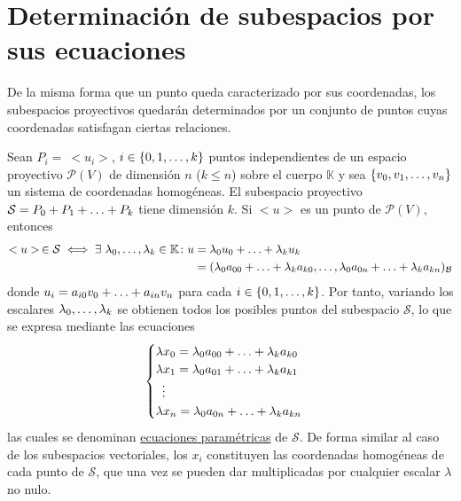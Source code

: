 \documentclass[12pt]{report}
\theoremstyle{definition}
\theoremstyle{definition}
\theoremstyle{remark}
\begin{document}
\section{Determinación de subespacios por sus ecuaciones}
De la misma forma que un punto queda caracterizado por sus coordenadas, los subespacios proyectivos quedarán determinados por un conjunto de puntos cuyas coordenadas satisfagan ciertas relaciones.

\vspace{2mm}
Sean $P_i = \ <u_i>$, $i \in \{0,1,\mathellipsis,k\}$ puntos independientes de un espacio proyectivo $\mathcal{P}(V)$ de dimensión $n$ ($k \leq n$) sobre el cuerpo $\mathbb{K}$ y sea $\{v_0,v_1,\mathellipsis,v_n\}$ un sistema de coordenadas homogéneas. El subespacio proyectivo $\mathcal{S} = P_0+P_1+\mathellipsis+P_k$ tiene dimensión $k$. Si $<u>$ es un punto de $\mathcal{P}(V)$, entonces
\[<u> \, \in \mathcal{S} \iff
\begin{aligned}[t]
\exists \ \lambda_0,\mathellipsis,\lambda_k \in \mathbb{K} \colon u &= \lambda_0u_0+\mathellipsis+\lambda_ku_k \\
&= (\lambda_0a_{00}+\mathellipsis+\lambda_ka_{k0},\mathellipsis,\lambda_0a_{0n}+\mathellipsis+\lambda_ka_{kn})_{\mathcal{B}}
\end{aligned}
\]
donde $u_i = a_{i0}v_0+\mathellipsis+a_{in}v_n$ para cada $i \in \{0,1,\mathellipsis,k\}$. Por tanto, variando los escalares $\lambda_0,\mathellipsis,\lambda_k$ se obtienen todos los posibles puntos del subespacio $\mathcal{S}$, lo que se expresa mediante las ecuaciones
\[
\begin{cases}
    \lambda x_0 = \lambda_0a_{00}+\mathellipsis+\lambda_ka_{k0} \\
    \lambda x_1 = \lambda_0a_{01}+\mathellipsis+\lambda_ka_{k1} \\
    \ \, \vdots \\
    \lambda x_n = \lambda_0a_{0n}+\mathellipsis+\lambda_ka_{kn}
\end{cases}
\]
las cuales se denominan \ul{ecuaciones paramétricas} de $\mathcal{S}$. De forma similar al caso de los subespacios vectoriales, los $x_i$ constituyen las coordenadas homogéneas de cada punto de $\mathcal{S}$, que una vez se pueden dar multiplicadas por cualquier escalar $\lambda$ no nulo.
\end{document}
